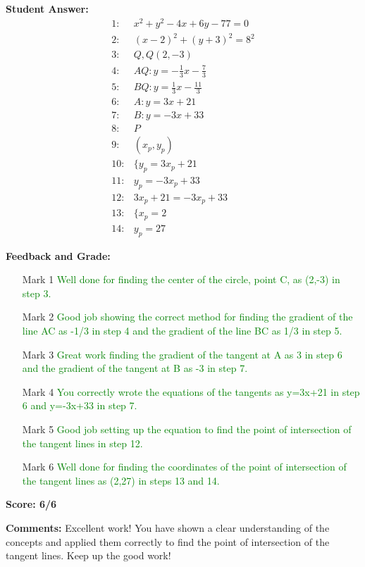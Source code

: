 \documentclass{article}
\begin{document}
\textbf{Student Answer:}
\begin{align*}
1: & x^2+y^2-4x+6y-77=0 \\
2: & (x-2)^2+(y+3)^2=8^2 \\
3: & Q,Q(2,-3) \\
4: & AQ:y=-\frac{1}{3}x-\frac{7}{3} \\
5: & BQ:y=\frac{1}{3}x-\frac{11}{3} \\
6: & A:y=3x+21 \\
7: & B:y=-3x+33 \\
8: & P \\
9: & (x_p,y_p) \\
10: & \{y_p=3x_p+21 \\
11: & y_p=-3x_p+33 \\
12: & 3x_p+21=-3x_p+33 \\
13: & \{x_p=2 \\
14: & y_p=27
\end{align*}

\textbf{Feedback and Grade:}
\begin{itemize}
\item[Mark 1] \textcolor{green}{Well done for finding the center of the circle, point C, as (2,-3) in step 3.}
\item[Mark 2] \textcolor{green}{Good job showing the correct method for finding the gradient of the line AC as -1/3 in step 4 and the gradient of the line BC as 1/3 in step 5.}
\item[Mark 3] \textcolor{green}{Great work finding the gradient of the tangent at A as 3 in step 6 and the gradient of the tangent at B as -3 in step 7.}
\item[Mark 4] \textcolor{green}{You correctly wrote the equations of the tangents as y=3x+21 in step 6 and y=-3x+33 in step 7.}
\item[Mark 5] \textcolor{green}{Good job setting up the equation to find the point of intersection of the tangent lines in step 12.}
\item[Mark 6] \textcolor{green}{Well done for finding the coordinates of the point of intersection of the tangent lines as (2,27) in steps 13 and 14.}
\end{itemize}

\textbf{Score: 6/6}

\textbf{Comments:} Excellent work! You have shown a clear understanding of the concepts and applied them correctly to find the point of intersection of the tangent lines. Keep up the good work!
\end{document}
